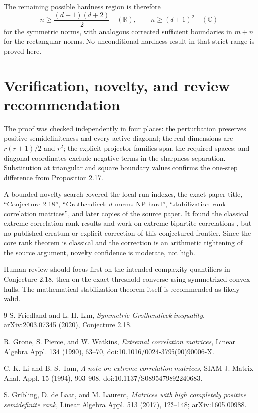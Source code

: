\documentclass[11pt]{article}
\newcommand{\R}{\mathbb R}
\newcommand{\C}{\mathbb C}
\begin{document}
The remaining possible hardness region is therefore
\[
 n\ge\frac{(d+1)(d+2)}2\quad(\R),\qquad
 n\ge(d+1)^2\quad(\C)
\]
for the symmetric norms, with analogous corrected sufficient boundaries in
$m+n$ for the rectangular norms.  No unconditional hardness result in that
strict range is proved here.

\section{Verification, novelty, and review recommendation}

The proof was checked independently in four places: the perturbation preserves
positive semidefiniteness and every active diagonal; the real dimensions are
$r(r+1)/2$ and $r^2$; the explicit projector families span the required
spaces; and diagonal coordinates exclude negative terms in the sharpness
separation.  Substitution at triangular and square boundary values confirms
the one-step difference from Proposition 2.17.

A bounded novelty search covered the local run indexes, the exact paper title,
``Conjecture 2.18'', ``Grothendieck $d$-norms NP-hard'', ``stabilization rank
correlation matrices'', and later copies of the source paper.  It found the
classical extreme-correlation rank results and work on extreme bipartite
correlations \cite{GDL}, but no published erratum or explicit correction of
this conjectured frontier.  Since the core rank theorem is classical and the
correction is an arithmetic tightening of the source argument, novelty
confidence is moderate, not high.

Human review should focus first on the intended complexity quantifiers in
Conjecture 2.18, then on the exact-threshold converse using symmetrized convex
hulls.  The mathematical stabilization theorem itself is recommended as
likely valid.

\begin{thebibliography}{9}
S. Friedland and L.-H. Lim,
\emph{Symmetric Grothendieck inequality}, arXiv:2003.07345 (2020),
Conjecture 2.18.

R. Grone, S. Pierce, and W. Watkins,
\emph{Extremal correlation matrices}, Linear Algebra Appl. 134 (1990),
63--70, doi:10.1016/0024-3795(90)90006-X.

C.-K. Li and B.-S. Tam,
\emph{A note on extreme correlation matrices}, SIAM J. Matrix Anal. Appl.
15 (1994), 903--908, doi:10.1137/S0895479892240683.

S. Gribling, D. de Laat, and M. Laurent,
\emph{Matrices with high completely positive semidefinite rank},
Linear Algebra Appl. 513 (2017), 122--148; arXiv:1605.00988.
\end{thebibliography}
\end{document}
